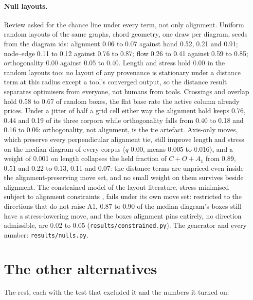 \documentclass[a4paper,UKenglish]{gd-lipics-v3}
\begin{document}
\paragraph{Null layouts.} Review asked for the chance line under every term, not only
alignment. Uniform random layouts of the same graphs, chord geometry, one draw per
diagram, seeds from the diagram ids: alignment 0.06 to 0.07 against hand 0.52, 0.21 and
0.91; node--edge 0.11 to 0.12 against 0.76 to 0.87; flow 0.26 to 0.41 against 0.59 to
0.85; orthogonality 0.00 against 0.05 to 0.40. Length and stress hold 0.00 in the random
layouts too: no layout of any provenance is stationary under a distance term at this
radius except a tool's converged output, so the distance result separates optimisers from
everyone, not humans from tools. Crossings and overlap hold 0.58 to 0.67 of random boxes,
the flat base rate the active column already prices. Under a jitter of half a grid cell either way the
alignment hold keeps 0.76, 0.44 and 0.19 of its three corpora while orthogonality falls
from 0.40 to 0.18 and 0.16 to 0.06: orthogonality, not alignment, is the tie artefact.
Axis-only moves, which preserve every perpendicular alignment tie, still improve length
and stress on the median diagram of every corpus ($q$ 0.00, means 0.005 to 0.016), and a
weight of 0.001 on length collapses the held fraction of $C{+}O{+}A_1$ from 0.89, 0.51
and 0.22 to 0.13, 0.11 and 0.07: the distance terms are unpriced even inside the
alignment-preserving move set, and no small weight on them survives beside alignment. The
constrained model of the layout literature, stress minimised subject to alignment
constraints \cite{ipsepcola06, dunnart08, setcola18}, fails under its own move set:
restricted to the directions that do not raise A1, 0.87 to 0.90 of the median diagram's
boxes still have a stress-lowering move, and the boxes alignment pins entirely, no
direction admissible, are 0.02 to 0.05 (\texttt{results/constrained.py}). The
generator and every number: \texttt{results/nulls.py}.

\section{The other alternatives}\label{app:alts}



The rest, each with the test that excluded it and the numbers it turned on:
\end{document}
